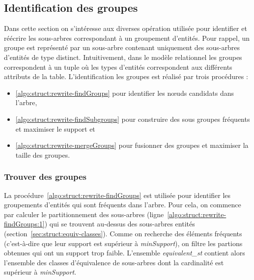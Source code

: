 \subsection{Identification des groupes}
Dans cette section on s'intéresse aux diverses opération utilisée pour identifier et réécrire les sous-arbres correspondant à un groupement d'entités.
Pour rappel, un groupe est représenté par un sous-arbre contenant uniquement des sous-arbres d'entités de type distinct.
Intuitivement, dans le modèle relationnel les groupes correspondent à un tuple où les types d'entités correspondent aux différents attributs de la table.
L'identification les groupes est réalisé par trois procédures :
\begin{itemize}
    \item \ref{algo:struct:rewrite-findGroups} pour identifier les nœuds candidats dans l'arbre,
    \item \ref{algo:struct:rewrite-findSubgroups} pour construire des sous groupes fréquents et maximiser le support et
    \item \ref{algo:struct:rewrite-mergeGroups} pour fusionner des groupes et maximiser la taille des groupes.
\end{itemize}

\subsubsection{Trouver des groupes}
La procédure~\ref{algo:struct:rewrite-findGroups} est utilisée pour identifier les groupements d'entités qui sont fréquents dans l'arbre.
Pour cela, on commence par calculer le partitionnement des sous-arbres (ligne~\ref{algo:struct:rewrite-findGroups:1}) qui se trouvent au-dessus des sous-arbres entités (section~\ref{sec:struct:equiv-classes}).
Comme on recherche des éléments fréquents (c'est-à-dire que leur support est supérieur à \emph{minSupport}), on filtre les partions obtenues qui ont un support trop faible.
L'ensemble \emph{equivalent\_st} contient alors l'ensemble des classes d'équivalence de sous-arbres dont la cardinalité est supérieur à \emph{minSupport}.

